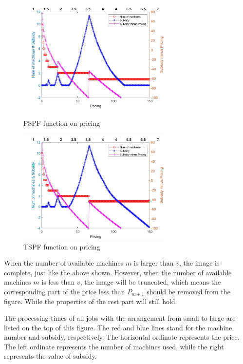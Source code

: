 \begin{figure}
\begin{minipage}[t]{0.5\linewidth}
\centering
\includegraphics[width=3in]{Figures/Image1}
\caption{PSPF function on pricing}
\label{fig-PSPF}
\end{minipage}%
\begin{minipage}[t]{0.5\linewidth}
\centering
\includegraphics[width=3in]{Figures/Image2}
\caption{TSPF function on pricing}
\label{fig-TSPF}
\end{minipage}
\end{figure}


\begin{remark}
  When the number of available machines $m$ is larger than $v$, the image is complete, just like the above shown. However, when the number of available machines $m$ is less than $v$, the image will be truncated, which means the corresponding part of the price less than $P_{m+1}$ should be removed from the figure. While the properties of the rest part will still hold.
\end{remark}

The processing times of all jobs with the arrangement from small to large are listed on the top of this figure.
The red and blue lines stand for the machine number and subsidy, respectively.
The horizontal ordinate represents the price.
The left ordinate represents the number of machines used, while the right represents the value of subsidy.

